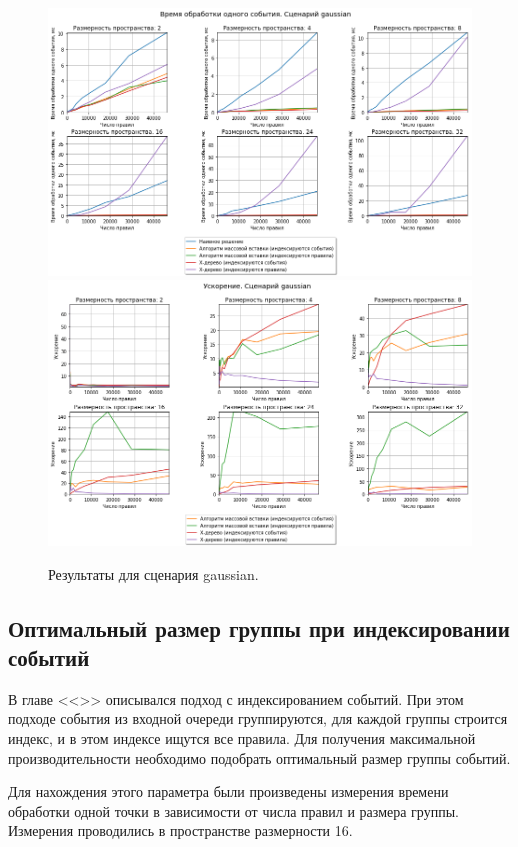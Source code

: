\documentclass[14pt]{article}
\begin{document}
\begin{figure}[p]
    \centering
    \includegraphics[width=1\textwidth]{images/time/gaussianTime.png}    \includegraphics[width=1\textwidth]{images/speedUp/gaussianSpeedUp.png}
    \caption{Результаты для сценария gaussian.}
    \label{fig:gaussian}
\end{figure}

\subsection{Оптимальный размер группы при индексировании событий}
В главе <<>> описывался подход с индексированием событий. При этом подходе события из входной очереди группируются, для каждой группы строится индекс, и в этом индексе ищутся все правила. Для получения максимальной производительности необходимо подобрать оптимальный размер группы событий.

Для нахождения этого параметра были произведены измерения времени обработки одной точки в зависимости от числа правил и размера группы. Измерения проводились в пространстве размерности 16.
\end{document}
